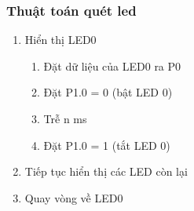 \documentclass[../report.tex]{subfiles}
\begin{document}
\subsubsection{Thuật toán quét led}
\begin{enumerate}
    \item Hiển thị LED0
        \begin{enumerate}
            \item Đặt dữ liệu của LED0 ra P0
            \item Đặt P1.0 = 0 (bật LED 0)
            \item Trễ n ms
            \item Đặt P1.0 = 1 (tắt LED 0)
        \end{enumerate}
    
    \item Tiếp tục hiển thị các LED còn lại
    \item Quay vòng về LED0
\end{enumerate}
\end{document}
